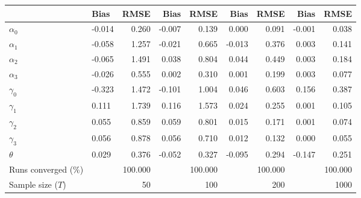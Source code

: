 
\begin{tabular}[t]{llrrrrrrr}
\toprule
  & Bias & RMSE & Bias & RMSE & Bias & RMSE & Bias & RMSE\\
\midrule
$\alpha_{0}$ & -0.014 & 0.260 & -0.007 & 0.139 & 0.000 & 0.091 & -0.001 & 0.038\\
$\alpha_{1}$ & -0.058 & 1.257 & -0.021 & 0.665 & -0.013 & 0.376 & 0.003 & 0.141\\
$\alpha_{2}$ & -0.065 & 1.491 & 0.038 & 0.804 & 0.044 & 0.449 & 0.003 & 0.184\\
$\alpha_{3}$ & -0.026 & 0.555 & 0.002 & 0.310 & 0.001 & 0.199 & 0.003 & 0.077\\
$\gamma_{0}$ & -0.323 & 1.472 & -0.101 & 1.004 & 0.046 & 0.603 & 0.156 & 0.387\\
$\gamma_{1}$ & 0.111 & 1.739 & 0.116 & 1.573 & 0.024 & 0.255 & 0.001 & 0.105\\
$\gamma_{2}$ & 0.055 & 0.859 & 0.059 & 0.801 & 0.015 & 0.171 & 0.001 & 0.074\\
$\gamma_{3}$ & 0.056 & 0.878 & 0.056 & 0.710 & 0.012 & 0.132 & 0.000 & 0.055\\
$\theta$ & 0.029 & 0.376 & -0.052 & 0.327 & -0.095 & 0.294 & -0.147 & 0.251\\
Runs converged (\%) &  & 100.000 &  & 100.000 &  & 100.000 &  & 100.000\\
Sample size ($T$) &  & 50 &  & 100 &  & 200 &  & 1000\\
\bottomrule
\end{tabular}
